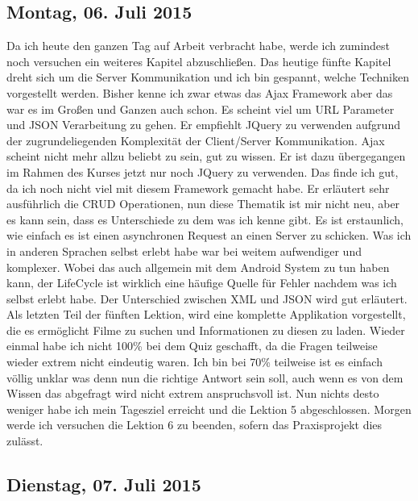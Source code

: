 \documentclass[12pt,a4paper,bibliography=totocnumbered,listof=totocnumbered]{scrartcl}
\begin{document}
\subsection{Montag, 06. Juli 2015}

Da ich heute den ganzen Tag auf Arbeit verbracht habe, werde ich zumindest noch versuchen ein weiteres Kapitel abzuschließen. 
Das heutige fünfte Kapitel dreht sich um die Server Kommunikation und ich bin gespannt, welche Techniken vorgestellt werden. Bisher kenne ich zwar etwas das Ajax Framework aber das war es im Großen und Ganzen auch schon. 
Es scheint viel um URL Parameter und JSON Verarbeitung zu gehen. Er empfiehlt JQuery zu verwenden aufgrund der zugrundeliegenden Komplexität der Client/Server Kommunikation. Ajax scheint nicht mehr allzu beliebt zu sein, gut zu wissen. Er ist dazu übergegangen im Rahmen des Kurses jetzt nur noch JQuery zu verwenden. Das finde ich gut, da ich noch nicht viel mit diesem Framework gemacht habe. Er erläutert sehr ausführlich die CRUD Operationen, nun diese Thematik ist mir nicht neu, aber es kann sein, dass es Unterschiede zu dem was ich kenne gibt. 
Es ist erstaunlich, wie einfach es ist einen asynchronen Request an einen Server zu schicken. Was ich in anderen Sprachen selbst erlebt habe war bei weitem aufwendiger und komplexer. Wobei das auch allgemein mit dem Android System zu tun haben kann, der LifeCycle ist wirklich eine häufige Quelle für Fehler nachdem was ich selbst erlebt habe. Der Unterschied zwischen XML und JSON wird gut erläutert. 
Als letzten Teil der fünften Lektion, wird eine komplette Applikation vorgestellt, die es ermöglicht Filme zu suchen und Informationen zu diesen zu laden.  
Wieder einmal habe ich nicht 100\% bei dem Quiz geschafft, da die Fragen teilweise wieder extrem nicht eindeutig waren. Ich bin bei 70\% teilweise ist es einfach völlig unklar was denn nun die richtige Antwort sein soll, auch wenn es von dem Wissen das abgefragt wird nicht extrem anspruchsvoll ist. 
Nun nichts desto weniger habe ich mein Tagesziel erreicht und die Lektion 5 abgeschlossen. Morgen werde ich versuchen die Lektion 6 zu beenden, sofern das Praxisprojekt dies zulässt. 

\subsection{Dienstag, 07. Juli 2015}
\end{document}
